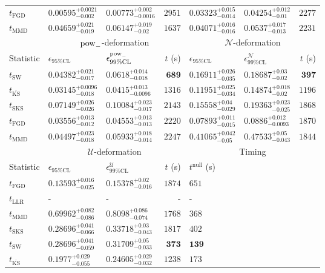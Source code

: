 \begin{tabular}{l|llr|llr}
	$t_{\mathrm{FGD}}$ & ${\mathbf{0.00595_{-0.002}^{+0.0021}}}$ & ${\mathbf{0.00773_{-0.0016}^{+0.002}}}$ & $2951$ & $0.03323_{-0.014}^{+0.015}$ & ${\mathbf{0.04254_{-0.01}^{+0.012}}}$ & $2277$ \\
	$t_{\mathrm{MMD}}$ & $0.04659_{-0.019}^{+0.021}$ & $0.06147_{-0.02}^{+0.019}$ & $1637$ & $0.04071_{-0.016}^{+0.016}$ & $0.0537_{-0.013}^{+0.017}$ & $2231$ \\
	\toprule
	\multicolumn{1}{c}{} & \multicolumn{3}{c}{$\rm{pow}_{-}$-deformation} & \multicolumn{3}{c}{$\mathcal{N}$-deformation} \\
	Statistic & $\epsilon_{95\%\mathrm{CL}}$ & $\epsilon^  {\rm{pow}_{-}}_{99\%\mathrm{CL}}$ & $t$ (s) & $\epsilon_{95\%\mathrm{CL}}$ & $\epsilon^    {\mathcal{N}}_{99\%\mathrm{CL}}$ & $t$ (s) \\
	\midrule
	$t_{\mathrm{SW}}$ & $0.04382_{-0.017}^{+0.021}$ & $0.0618_{-0.018}^{+0.014}$ & ${\mathbf{689}}$ & $0.16911_{-0.035}^{+0.026}$ & $0.18687_{-0.02}^{+0.03}$ & ${\mathbf{397}}$ \\
	$t_{\overline{\mathrm{KS}}}$ & ${\mathbf{0.03145_{-0.018}^{+0.0096}}}$ & ${\mathbf{0.0415_{-0.0096}^{+0.013}}}$ & $1316$ & $0.11951_{-0.034}^{+0.025}$ & $0.14874_{-0.02}^{+0.018}$ & $1196$ \\
	$t_{\mathrm{SKS}}$ & $0.07149_{-0.026}^{+0.026}$ & $0.10084_{-0.017}^{+0.023}$ & $2143$ & $0.15558_{-0.029}^{+0.04}$ & $0.19363_{-0.025}^{+0.023}$ & $1868$ \\
	$t_{\mathrm{FGD}}$ & $0.03556_{-0.012}^{+0.013}$ & $0.04553_{-0.013}^{+0.013}$ & $2220$ & ${\mathbf{0.07893_{-0.015}^{+0.011}}}$ & ${\mathbf{0.0886_{-0.0093}^{+0.012}}}$ & $1870$ \\
	$t_{\mathrm{MMD}}$ & $0.04497_{-0.018}^{+0.023}$ & $0.05933_{-0.014}^{+0.018}$ & $2247$ & $0.41065_{-0.05}^{+0.042}$ & $0.47533_{-0.043}^{+0.05}$ & $1844$ \\
	\toprule
	\multicolumn{1}{c}{} & \multicolumn{3}{c}{$\mathcal{U}$-deformation} & \multicolumn{3}{c}{Timing} \\
	Statistic & $\epsilon_{95\%\mathrm{CL}}$ & $\epsilon^    {\mathcal{U}}_{99\%\mathrm{CL}}$ & $t$ (s) & $t^{\mathrm{null}}$ (s) \\
	\midrule
	$t_{\mathrm{FGD}}$ & ${\mathbf{0.13593_{-0.025}^{+0.016}}}$ & ${\mathbf{0.15378_{-0.016}^{+0.02}}}$ & $1874$ & $651$ \\
	$t_{\mathrm{LLR}}$ & - & - & - & - \\
	$t_{\mathrm{MMD}}$ & $0.69962_{-0.086}^{+0.082}$ & $0.8098_{-0.074}^{+0.086}$ & $1768$ & $368$ \\
	$t_{\mathrm{SKS}}$ & $0.28696_{-0.066}^{+0.041}$ & $0.33718_{-0.043}^{+0.03}$ & $1817$ & $402$ \\
	$t_{\mathrm{SW}}$ & $0.28696_{-0.059}^{+0.041}$ & $0.31709_{-0.033}^{+0.05}$ & ${\mathbf{373}}$ & ${\mathbf{139}}$ \\
	$t_{\overline{\mathrm{KS}}}$ & $0.1977_{-0.055}^{+0.029}$ & $0.24605_{-0.032}^{+0.029}$ & $1238$ & $173$ \\
	\bottomrule
\end{tabular}